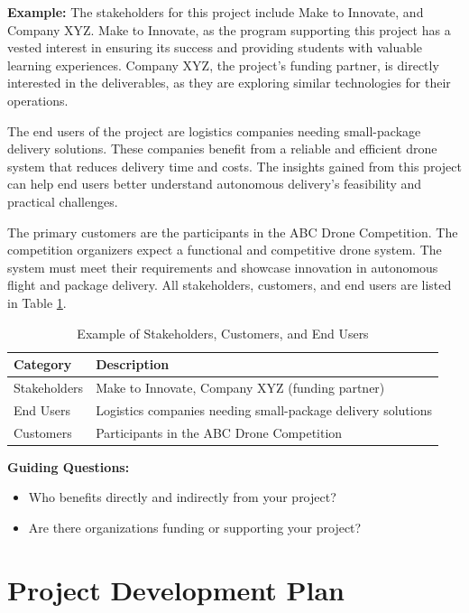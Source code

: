 \textbf{Example:}
The stakeholders for this project include Make to Innovate, and Company XYZ. Make to Innovate, as the program supporting this project has a vested interest in ensuring its success and providing students with valuable learning experiences. Company XYZ, the project's funding partner, is directly interested in the deliverables, as they are exploring similar technologies for their operations.

The end users of the project are logistics companies needing small-package delivery solutions. These companies benefit from a reliable and efficient drone system that reduces delivery time and costs. The insights gained from this project can help end users better understand autonomous delivery's feasibility and practical challenges.

The primary customers are the participants in the ABC Drone Competition. The competition organizers expect a functional and competitive drone system. The system must meet their requirements and showcase innovation in autonomous flight and package delivery. All stakeholders, customers, and end users are listed in Table \ref{tab:stakeholders}.

\begin{table}[ht!]
    \centering
    \begin{tabular}{|l|l|}
        \hline
        \textbf{Category} & \textbf{Description} \\ \hline
        Stakeholders & Make to Innovate, Company XYZ (funding partner) \\ \hline
        End Users & Logistics companies needing small-package delivery solutions \\ \hline
        Customers & Participants in the ABC Drone Competition \\ \hline
    \end{tabular}
    \caption{Example of Stakeholders, Customers, and End Users}
    \label{tab:stakeholders}
\end{table}

\textbf{Guiding Questions:}
\begin{itemize}
    \item Who benefits directly and indirectly from your project?
    \item Are there organizations funding or supporting your project?
\end{itemize}

\newpage
\section{Project Development Plan}

